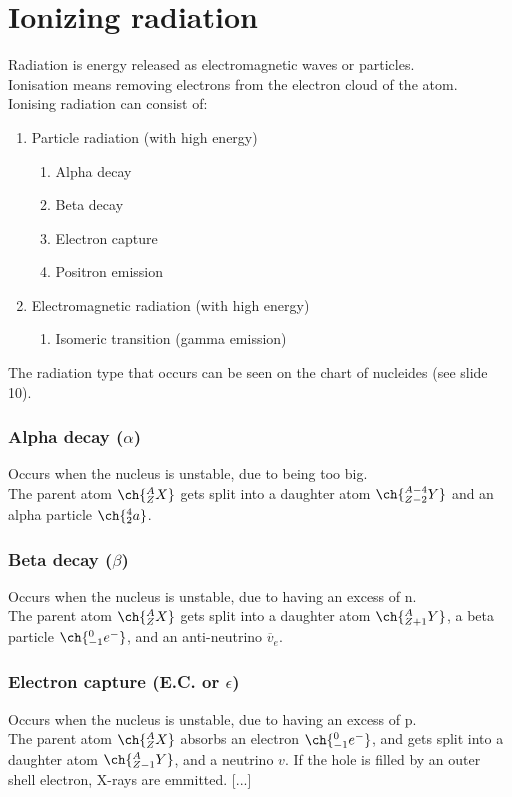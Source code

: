 \section{Ionizing radiation}
Radiation is energy released as electromagnetic waves or particles. \\
Ionisation means removing electrons from the electron cloud of the atom. \\
Ionising radiation can consist of:
 \begin{enumerate}
	\item Particle radiation (with high energy)
	 \begin{enumerate}
		\item Alpha decay
		\item Beta decay
		\item Electron capture
		\item Positron emission
	\end{enumerate}
	 \item Electromagnetic radiation (with high energy)
	 \begin{enumerate}
		\item Isomeric transition (gamma emission)
	\end{enumerate}	 
\end{enumerate}
The radiation type that occurs can be seen on the chart of nucleides (see slide 10). 
\subsubsection{Alpha decay ($\alpha$)}
Occurs when the nucleus is unstable, due to being too big.\\
The parent atom $\ch{^{A}_{Z}X}$ gets split into a daughter atom $\ch{^{A-4}_{Z-2}Y}$ and an alpha particle $\ch{^{4}_{2}a}$.
\subsubsection{Beta decay ($\beta$)}
Occurs when the nucleus is unstable, due to having an excess of n.\\
The parent atom $\ch{^{A}_{Z}X}$ gets split into a daughter atom $\ch{^{A}_{Z+1}Y}$, a beta particle $\ch{^{0}_{-1}e^{-}}$, and an anti-neutrino $\overline{v}_e$.
\subsubsection{Electron capture (E.C. or $\epsilon$)}
Occurs when the nucleus is unstable, due to having an excess of p.\\
The parent atom $\ch{^{A}_{Z}X}$ absorbs an electron $\ch{^{0}_{-1}e^{-}}$, and gets split into a daughter atom $\ch{^{A}_{Z-1}Y}$, and a neutrino $v$.
If the hole is filled by an outer shell electron, X-rays are emmitted.
[...]

